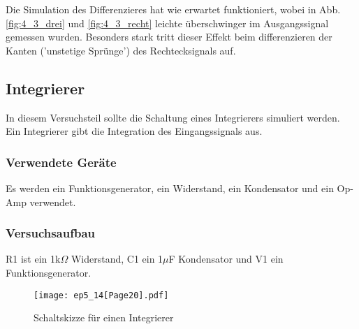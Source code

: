 \documentclass[12pt,a4paper]{article}
\begin{document}
Die Simulation des Differenzieres hat wie erwartet funktioniert, wobei in Abb. \ref{fig:4_3_drei} und \ref{fig:4_3_recht} leichte überschwinger im Ausgangssignal gemessen wurden. Besonders stark tritt dieser Effekt beim differenzieren der Kanten ('unstetige Sprünge') des Rechtecksignals auf.

\subsection{Integrierer}

In diesem Versuchsteil sollte die Schaltung eines Integrierers simuliert werden. Ein Integrierer gibt die Integration des Eingangssignals aus.

\subsubsection{Verwendete Geräte}

Es werden ein Funktionsgenerator, ein Widerstand, ein Kondensator und ein Op-Amp verwendet.


\subsubsection{Versuchsaufbau}

R1 ist ein 1k$\Omega$ Widerstand, C1 ein 1$\mu$F Kondensator und V1 ein Funktionsgenerator.

\begin{figure}[H] 
  \centering
    \texttt{[image: ep5\_14[Page20].pdf]}
  	\caption[Schaltskizze für einen Integrierer]{Schaltskizze für einen Integrierer\footnotemark}
  \label{fig:4_a_4}
\end{figure}
\end{document}
